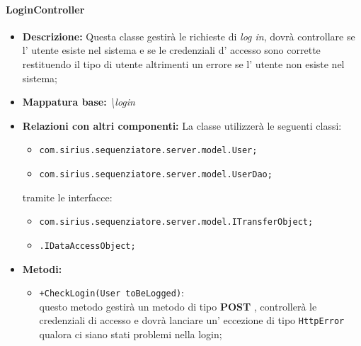 \paragraph{LoginController}%
\begin{itemize}
	\item \textbf{Descrizione: }Questa classe gestirà le richieste di \textit{log in}, dovrà controllare se l' utente esiste nel sistema e se le credenziali d' accesso sono corrette restituendo il tipo di utente altrimenti un errore se l' utente non esiste nel sistema;
	\item \textbf{Mappatura base: }\textit{\textbackslash login}
	\item \textbf{Relazioni con altri componenti: }
	La classe utilizzerà le seguenti classi:
	\begin{itemize}
		\item \texttt{com.sirius.sequenziatore.server.model.User;}
		\item \texttt{com.sirius.sequenziatore.server.model.UserDao;}
	\end{itemize}
	tramite le interfacce:
	\begin{itemize}
		\item \texttt{com.sirius.sequenziatore.server.model.ITransferObject;}
		\item \texttt{\sModel .IDataAccessObject;}
	\end{itemize}
	\item \textbf{Metodi: }\begin{itemize}
					\item \texttt{+CheckLogin(User toBeLogged)}:\\
					 questo metodo gestirà un metodo di tipo \textbf{POST} , controllerà le credenziali di accesso e dovrà lanciare un' eccezione di tipo \texttt{HttpError} qualora ci siano stati problemi nella login;
				\end{itemize}
\end{itemize}
